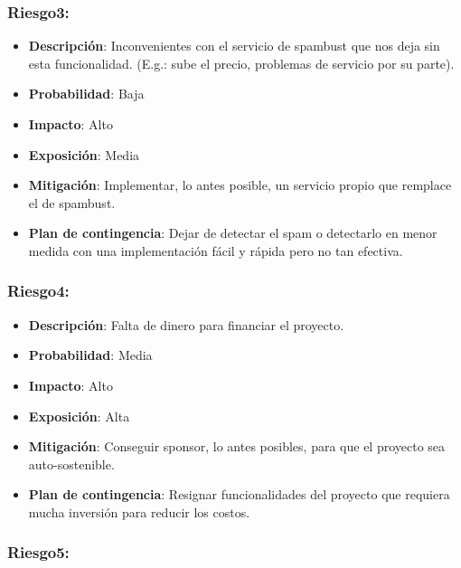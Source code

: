 \subsubsection{Riesgo3:}

\begin{itemize}
\itemsep1pt\parskip0pt
\item
  \textbf{Descripción}: Inconvenientes con el servicio de spambust que
  nos deja sin esta funcionalidad. (E.g.: sube el precio, problemas de
  servicio por su parte).
\item
  \textbf{Probabilidad}: Baja
\item
  \textbf{Impacto}: Alto
\item
  \textbf{Exposición}: Media
\item
  \textbf{Mitigación}: Implementar, lo antes posible, un servicio propio
  que remplace el de spambust.
\item
  \textbf{Plan de contingencia}: Dejar de detectar el spam o detectarlo
  en menor medida con una implementación fácil y rápida pero no tan
  efectiva.
\end{itemize}

\subsubsection{Riesgo4:}

\begin{itemize}
\itemsep1pt\parskip0pt
\item
  \textbf{Descripción}: Falta de dinero para financiar el proyecto.
\item
  \textbf{Probabilidad}: Media
\item
  \textbf{Impacto}: Alto
\item
  \textbf{Exposición}: Alta
\item
  \textbf{Mitigación}: Conseguir sponsor, lo antes posibles, para que el
  proyecto sea auto-sostenible.
\item
  \textbf{Plan de contingencia}: Resignar funcionalidades del proyecto
  que requiera mucha inversión para reducir los costos.
\end{itemize}

\subsubsection{Riesgo5:}


